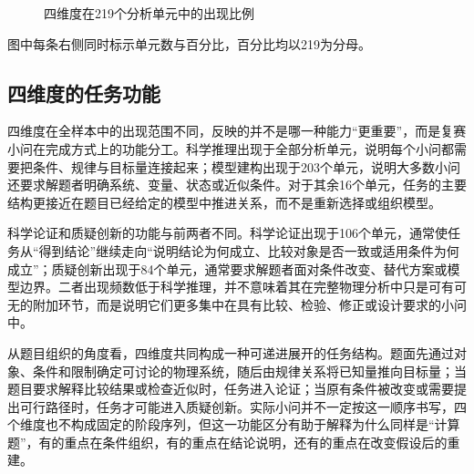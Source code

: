 \documentclass[
  12pt,
  a4paper]{ctexbook}
\begin{document}
\begin{figure}[H]
\centering
{}
\caption{四维度在219个分析单元中的出现比例}
\label{fig:dimension-presence}
\end{figure}

图中每条右侧同时标示单元数与百分比，百分比均以219为分母。

\subsection{四维度的任务功能}\label{ux56dbux7ef4ux5ea6ux7684ux4efbux52a1ux529fux80fd}

四维度在全样本中的出现范围不同，反映的并不是哪一种能力``更重要''，而是复赛小问在完成方式上的功能分工。科学推理出现于全部分析单元，说明每个小问都需要把条件、规律与目标量连接起来；模型建构出现于203个单元，说明大多数小问还要求解题者明确系统、变量、状态或近似条件。对于其余16个单元，任务的主要结构更接近在题目已经给定的模型中推进关系，而不是重新选择或组织模型。

科学论证和质疑创新的功能与前两者不同。科学论证出现于106个单元，通常使任务从``得到结论''继续走向``说明结论为何成立、比较对象是否一致或适用条件为何成立''；质疑创新出现于84个单元，通常要求解题者面对条件改变、替代方案或模型边界。二者出现频数低于科学推理，并不意味着其在完整物理分析中只是可有可无的附加环节，而是说明它们更多集中在具有比较、检验、修正或设计要求的小问中。

从题目组织的角度看，四维度共同构成一种可递进展开的任务结构。题面先通过对象、条件和限制确定可讨论的物理系统，随后由规律关系将已知量推向目标量；当题目要求解释比较结果或检查近似时，任务进入论证；当原有条件被改变或需要提出可行路径时，任务才可能进入质疑创新。实际小问并不一定按这一顺序书写，四个维度也不构成固定的阶段序列，但这一功能区分有助于解释为什么同样是``计算题''，有的重点在条件组织，有的重点在结论说明，还有的重点在改变假设后的重建。
\end{document}

